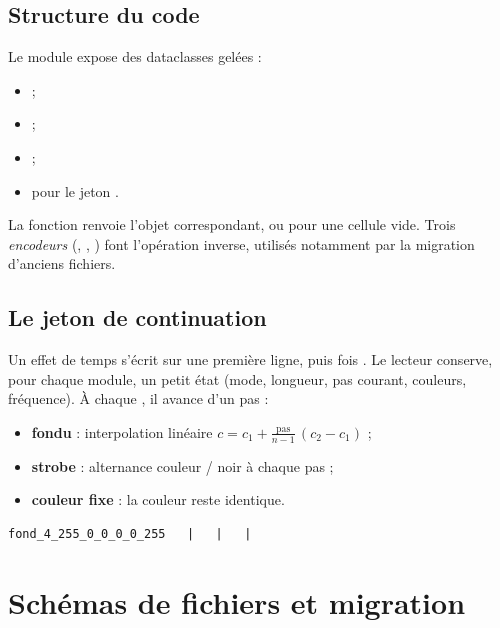 \section{Structure du code}

Le module expose des dataclasses gelées :

\begin{itemize}[leftmargin=1.4em]
  \item {} ;
  \item {} ;
  \item {} ;
  \item {} pour le jeton \token{|}.
\end{itemize}

La fonction  renvoie l'objet correspondant, ou 
pour une cellule vide. Trois \emph{encodeurs} (,
, ) font l'opération inverse, utilisés
notamment par la migration d'anciens fichiers.

\section{Le jeton de continuation}

Un effet de  temps s'écrit sur une première ligne, puis  fois
\token{|}. Le lecteur conserve, pour chaque module, un petit état
(mode, longueur, pas courant, couleurs, fréquence). À chaque \token{|}, il
avance d'un pas :

\begin{itemize}[leftmargin=1.4em]
  \item \textbf{fondu} : interpolation linéaire
        $c = c_1 + \frac{\text{pas}}{n-1}\,(c_2 - c_1)$ ;
  \item \textbf{strobe} : alternance couleur / noir à chaque pas ;
  \item \textbf{couleur fixe} : la couleur reste identique.
\end{itemize}

\begin{lstlisting}[caption={Exemple : un fondu de 4 temps du rouge au bleu.},numbers=none]
fond_4_255_0_0_0_0_255   |   |   |
\end{lstlisting}

\chapter{Schémas de fichiers et migration}
\label{ch:schemas}

